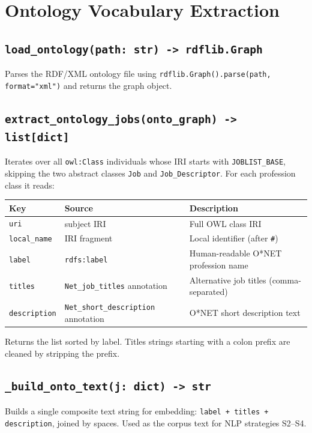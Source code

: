 ﻿\documentclass[12pt,a4paper]{article}
\begin{document}
\clearpage
\section{Ontology Vocabulary Extraction}

\subsection{\texttt{load\_ontology(path: str) -> rdflib.Graph}}
Parses the RDF/XML ontology file using \texttt{rdflib.Graph().parse(path, format="xml")} and returns the graph object.

\subsection{\texttt{extract\_ontology\_jobs(onto\_graph) -> list[dict]}}

Iterates over all \texttt{owl:Class} individuals whose IRI starts with \texttt{JOBLIST\_BASE}, skipping the two abstract classes \texttt{Job} and \texttt{Job\_Descriptor}. For each profession class it reads:

\begin{longtable}{@{}P{3.5cm}P{2.5cm}P{8.5cm}@{}}
\toprule
\textbf{Key} & \textbf{Source} & \textbf{Description} \\
\midrule
\endhead
\texttt{uri} & subject IRI & Full OWL class IRI \\
\texttt{local\_name} & IRI fragment & Local identifier (after \texttt{\#}) \\
\texttt{label} & \texttt{rdfs:label} & Human-readable O*NET profession name \\
\texttt{titles} & \texttt{Net\_job\_titles} annotation & Alternative job titles (comma-separated) \\
\texttt{description} & \texttt{Net\_short\_description} annotation & O*NET short description text \\
\bottomrule
\end{longtable}

Returns the list sorted by label. Titles strings starting with a colon prefix are cleaned by stripping the prefix.

\subsection{\texttt{\_build\_onto\_text(j: dict) -> str}}
Builds a single composite text string for embedding: \texttt{label + titles + description}, joined by spaces. Used as the corpus text for NLP strategies S2--S4.
\end{document}
